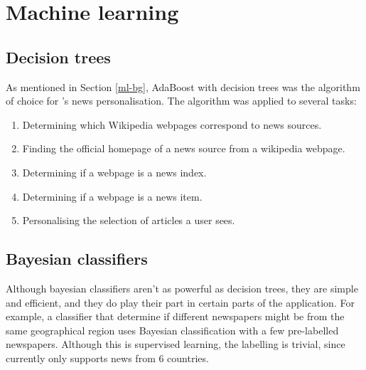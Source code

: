 \section{Machine learning\label{ml}}
\subsection{Decision trees} 
As mentioned in Section \ref{ml-bg}, AdaBoost 
with decision trees was the algorithm of choice for \nr{}'s news
personalisation.  The algorithm was applied to several tasks:
\begin{enumerate}
    \item Determining which Wikipedia webpages correspond to news sources.
    \item Finding the official homepage of a news source from a
          wikipedia webpage.
    \item Determining if a webpage is a news index.
    \item Determining if a webpage is a news item.
    \item Personalising the selection of articles a user sees.
\end{enumerate}
\subsection{Bayesian classifiers}
Although bayesian classifiers aren't as powerful as decision trees,
they are simple and efficient, and they do play their part in certain
parts of the \nr{} application.  For example, a classifier that determine
if different newspapers might be from the same geographical region
uses Bayesian classification with a few pre-labelled newspapers.  Although
this is supervised learning, the labelling is trivial, since \nr{}
currently only supports news from 6 countries.
